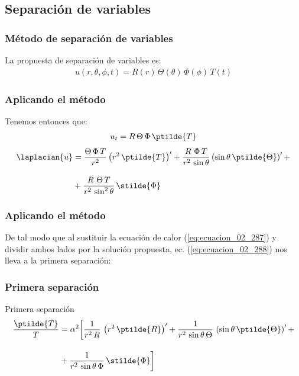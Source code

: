 \subsection{Separación de variables}
\begin{frame}
\frametitle{Método de separación de variables}
La propuesta de separación de variables es:
\begin{align}
u(r, \theta, \phi, t) = R(r) \, \Theta (\theta) \, \Phi(\phi) \, T(t)
\label{eq:ecuacion_02_288}
\end{align}
\end{frame}
\begin{frame}
\frametitle{Aplicando el método}
Tenemos entonces que:
\begin{align}
u_{t} = R \, \Theta \, \Phi \, \ptilde{T} \label{eq:ecuacion_02_289}
\end{align}
\begin{align}
\begin{aligned}
\laplacian{u} &= \dfrac{\Theta \, \Phi \, T}{r^{2}} \left( r^{2} \, \ptilde{T} \right)^{\prime} + \dfrac{R \, \, \Phi \, T}{r^{2} \, \sin \theta} \left( \sin \theta \, \ptilde{\Theta} \right)^{\prime} + \\[1em]
&+ \dfrac{R \, \, \Theta \, T}{r^{2} \, \sin^{2} \theta} \, \stilde{\Phi}
\end{aligned}
\label{eq:ecuacion_02_290}
\end{align}
\end{frame}
\begin{frame}
\frametitle{Aplicando el método}
De tal modo que al sustituir la ecuación de calor (\ref{eq:ecuacion_02_287}) y dividir ambos lados por la solución propuesta, ec. (\ref{eq:ecuacion_02_288}) nos lleva a la primera separación:
\end{frame}
\begin{frame}
\frametitle{Primera separación}
Primera separación
\begin{align}
\begin{aligned}
\dfrac{\ptilde{T}}{T} &= \alpha^{2} \bigg[ \dfrac{1}{r^{2} \, R} \, \left( r^{2} \, \ptilde{R} \right)^{\prime} + \dfrac{1}{r^{2} \, \sin \theta \, \Theta} \, \left( \sin \theta \, \ptilde{\Theta} \right)^{\prime} + \\[1em]
&+ \dfrac{1}{r^{2} \, \sin \theta \, \Phi} \, \stilde{\Phi} \bigg]
\end{aligned}
\label{eq:}
\end{align}
\end{frame}
